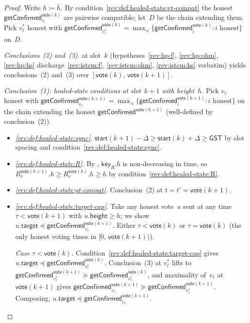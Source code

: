 \documentclass{article}
\newcommand{\target}{\mathsf{target}}
\newcommand{\height}{\mathsf{height}}
\newcommand{\key}{\mathsf{key}}
\newcommand{\start}{\mathsf{start}}
\newcommand{\vote}{\mathsf{vote}}
\newcommand{\comm}[1]{\bar{#1}}
\newcommand{\getConfirmed}{\textsf{getConfirmed}\xspace}
\theoremstyle{plain}
\theoremstyle{definition}
\theoremstyle{remark}
\newcommand{\GST}{\ensuremath{\mathsf{GST}}}
\begin{document}
\begin{proof}
Write $h \coloneqq \comm{h}$. By condition~\ref{rev:def:healed-state:gt-compat} the honest $\getConfirmed_v^{\vote(k)}$ are pairwise compatible; let~$D$ be the chain extending them. Pick $v^*_\ell$ honest with $\getConfirmed_{v^*_\ell}^{\vote(k)} = \max_\preceq \{\getConfirmed_i^{\vote(k)} : i \text{ honest}\}$ on~$D$.

\emph{Conclusions~(2) and~(3).}
 at slot~$k$ (hypotheses~\ref{rev:hp:f}, \ref{rev:hp:ohm}, \ref{rev:hp:hs} discharge~\ref{rev:istcm:f}, \ref{rev:istcm:ohm}, \ref{rev:istcm:hs} verbatim) yields conclusions~(2) and~(3) over $[\vote(k),\, \vote(k+1)]$.

\emph{Conclusion~(1): healed-state conditions at slot~$k+1$ with height~$h$.}
Pick $v_\ell$ honest with $\getConfirmed_{v_\ell}^{\vote(k+1)} = \max_\preceq \{\getConfirmed_i^{\vote(k+1)} : i \text{ honest}\}$ on the chain extending the honest $\getConfirmed^{\vote(k+1)}$ (well-defined by conclusion~(2)).
\begin{itemize}
  \item \emph{\ref{rev:def:healed-state:sync}.}
  $\start(k+1) - \Delta \geq \start(k) + \Delta \geq \GST$ by slot spacing and condition~\ref{rev:def:healed-state:sync}.

  \item \emph{\ref{rev:def:healed-state:R}.}
  By , $\key_R.h$ is non-decreasing in time, so $R_v^{\vote(k+1)}.h \geq R_v^{\vote(k)}.h \geq h$ by condition~\ref{rev:def:healed-state:R}.

  \item \emph{\ref{rev:def:healed-state:gt-compat}.}
  Conclusion~(2) at $t = t' = \vote(k+1)$.

  \item \emph{\ref{rev:def:healed-state:target-cap}.}
  Take any honest vote~$u$ sent at any time $\tau < \vote(k+1)$ with $u.\height \geq h$; we show $u.\target \preceq \getConfirmed_{v_\ell}^{\vote(k+1)}$. Either $\tau < \vote(k)$ or $\tau = \vote(k)$ (the only honest voting times in $[0,\, \vote(k+1))$).

  \emph{Case $\tau < \vote(k)$.}
  Condition~\ref{rev:def:healed-state:target-cap} gives $u.\target \preceq \getConfirmed_{v^*_\ell}^{\vote(k)}$. Conclusion~(3) at $v^*_\ell$ lifts to $\getConfirmed_{v^*_\ell}^{\vote(k+1)} \succeq \getConfirmed_{v^*_\ell}^{\vote(k)}$, and maximality of~$v_\ell$ at $\vote(k+1)$ gives $\getConfirmed_{v_\ell}^{\vote(k+1)} \succeq \getConfirmed_{v^*_\ell}^{\vote(k+1)}$. Composing, $u.\target \preceq \getConfirmed_{v_\ell}^{\vote(k+1)}$.


\end{itemize}
\end{proof}
\end{document}

